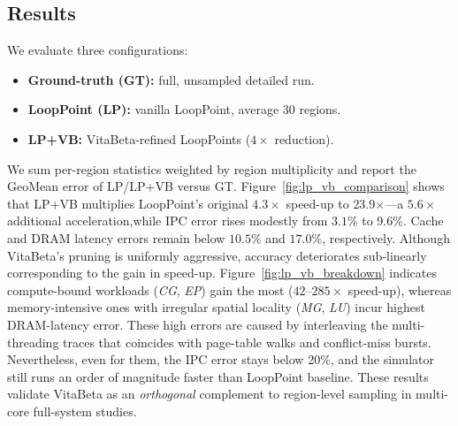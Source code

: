 \subsection{Results}
We evaluate three configurations:
\begin{itemize}[nosep, leftmargin=*]
    \item \textbf{Ground-truth (GT): }  full, unsampled detailed run.
    \item \textbf{LoopPoint (LP): }  vanilla LoopPoint, average 30 regions.
    \item \textbf{LP+VB: } VitaBeta-refined LoopPoints ($4\times$ reduction).
\end{itemize}
\smallskip\noindent
We sum per-region statistics weighted by region
multiplicity and report the GeoMean error of
\textsc{LP}/\textsc{LP+VB} versus \textsc{GT}.  
Figure~\ref{fig:lp_vb_comparison} shows that \textsc{LP+VB} multiplies
LoopPoint’s original $4.3\times$ speed-up to {23.9$\times$}—a $5.6\times$ additional acceleration,while IPC error rises modestly from $3.1\%$ to {9.6\%}.  Cache and DRAM latency errors remain below $10.5\%$ and $17.0\%$,
respectively.  Although VitaBeta’s pruning is uniformly aggressive, accuracy deteriorates sub-linearly corresponding to the gain in speed-up. Figure~\ref{fig:lp_vb_breakdown} indicates compute-bound workloads
(\textit{CG}, \textit{EP}) gain the most ($42$–$285\times$ speed-up),
whereas memory-intensive ones with irregular spatial locality (\textit{MG}, \textit{LU}) incur 
highest DRAM-latency error.  These high errors are caused by interleaving the multi-threading traces that coincides with page-table walks and conflict-miss bursts. Nevertheless, even for them, the IPC error stays below 20\%, and the simulator still runs an order of magnitude faster than  LoopPoint baseline. 
These results validate VitaBeta as an \emph{orthogonal}
complement to region-level sampling in multi-core full-system studies.  
 
 


